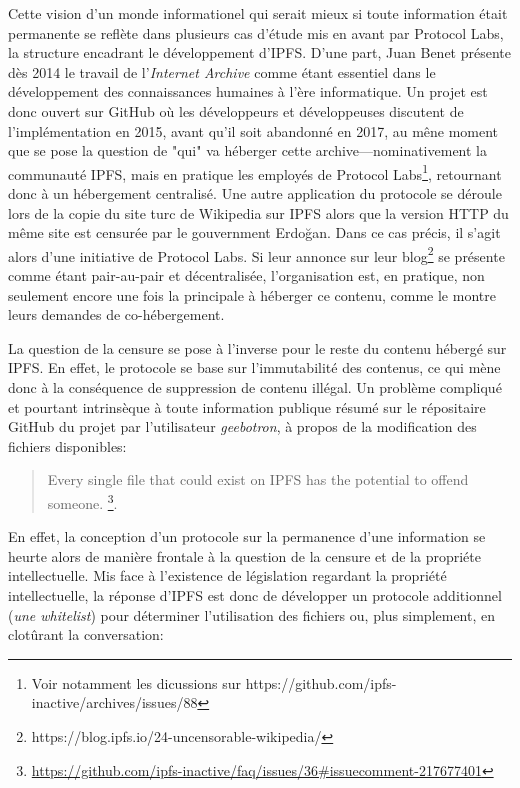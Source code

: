 \documentclass{article}
\begin{document}
Cette vision d'un monde informationel qui serait mieux si toute information était permanente se reflète dans plusieurs cas d'étude mis en avant par Protocol Labs, la structure encadrant le développement d'IPFS. D'une part, Juan Benet présente dès 2014 le travail de l'\emph{Internet Archive} comme étant essentiel dans le développement des connaissances humaines à l'ère informatique. Un projet est donc ouvert sur GitHub où les développeurs et développeuses discutent de l'implémentation en 2015, avant qu'il soit abandonné en 2017, au mêne moment que se pose la question de "qui" va héberger cette archive—nominativement la communauté IPFS, mais en pratique les employés de Protocol Labs\footnote{Voir notamment les dicussions sur https://github.com/ipfs-inactive/archives/issues/88}, retournant donc à un hébergement centralisé. Une autre application du protocole se déroule lors de la copie du site turc de Wikipedia sur IPFS alors que la version HTTP du même site est censurée par le gouvernment Erdoğan. Dans ce cas précis, il s'agit alors d'une initiative de Protocol Labs. Si leur annonce sur leur blog\footnote{https://blog.ipfs.io/24-uncensorable-wikipedia/} se présente comme étant pair-au-pair et décentralisée, l'organisation est, en pratique, non seulement encore une fois la principale à héberger ce contenu, comme le montre leurs demandes de co-hébergement.

La question de la censure se pose à l'inverse pour le reste du contenu hébergé sur IPFS. En effet, le protocole se base sur l'immutabilité des contenus, ce qui mène donc à la conséquence de suppression de contenu illégal. Un problème compliqué et pourtant intrinsèque à toute information publique résumé sur le répositaire GitHub du projet par l'utilisateur \emph{geebotron}, à propos de la modification des fichiers disponibles:

\begin{quote}
    Every single file that could exist on IPFS has the potential to offend someone. \footnote{\url{https://github.com/ipfs-inactive/faq/issues/36\#issuecomment-217677401}}.
\end{quote}

En effet, la conception d'un protocole sur la permanence d'une information se heurte alors de manière frontale à la question de la censure et de la propriéte intellectuelle. Mis face à l'existence de législation regardant la propriété intellectuelle, la réponse d'IPFS est donc de développer  un protocole additionnel (\emph{une whitelist}) pour déterminer l'utilisation des fichiers ou, plus simplement, en clotûrant la conversation:
\end{document}
